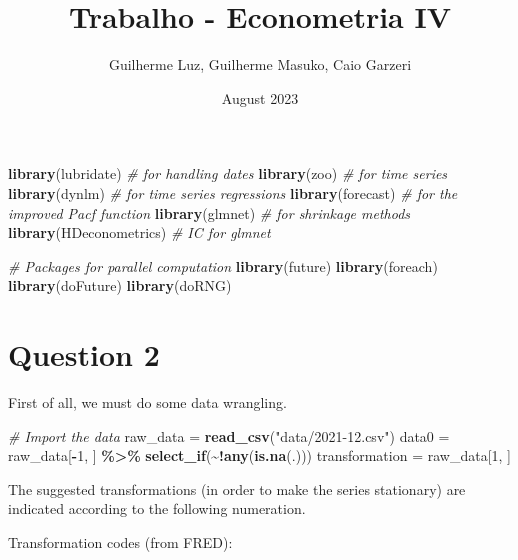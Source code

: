\documentclass[
]{article}
\title{Trabalho - Econometria IV}
\author{Guilherme Luz, Guilherme Masuko, Caio Garzeri}
\date{August 2023}
\newenvironment{Shaded}{\begin{snugshade}}{\end{snugshade}}
\newcommand{\CommentTok}[1]{\textcolor[rgb]{0.56,0.35,0.01}{\textit{#1}}}
\newcommand{\DecValTok}[1]{\textcolor[rgb]{0.00,0.00,0.81}{#1}}
\newcommand{\FunctionTok}[1]{\textcolor[rgb]{0.13,0.29,0.53}{\textbf{#1}}}
\newcommand{\NormalTok}[1]{#1}
\newcommand{\OtherTok}[1]{\textcolor[rgb]{0.56,0.35,0.01}{#1}}
\newcommand{\SpecialCharTok}[1]{\textcolor[rgb]{0.81,0.36,0.00}{\textbf{#1}}}
\newcommand{\StringTok}[1]{\textcolor[rgb]{0.31,0.60,0.02}{#1}}
\begin{document}
\maketitle

\begin{Shaded}
\begin{Highlighting}[]
\FunctionTok{library}\NormalTok{(lubridate)  }\CommentTok{\# for handling dates}
\FunctionTok{library}\NormalTok{(zoo)  }\CommentTok{\# for time series}
\FunctionTok{library}\NormalTok{(dynlm)  }\CommentTok{\# for time series regressions}
\FunctionTok{library}\NormalTok{(forecast)  }\CommentTok{\# for the improved Pacf function}
\FunctionTok{library}\NormalTok{(glmnet)  }\CommentTok{\# for shrinkage methods}
\FunctionTok{library}\NormalTok{(HDeconometrics)  }\CommentTok{\# IC for glmnet}

\CommentTok{\# Packages for parallel computation}
\FunctionTok{library}\NormalTok{(future)}
\FunctionTok{library}\NormalTok{(foreach)}
\FunctionTok{library}\NormalTok{(doFuture)}
\FunctionTok{library}\NormalTok{(doRNG)}
\end{Highlighting}
\end{Shaded}

\hypertarget{question-2}{%
\section{Question 2}\label{question-2}}

First of all, we must do some data wrangling.

\begin{Shaded}
\begin{Highlighting}[]
\CommentTok{\# Import the data}
\NormalTok{raw\_data }\OtherTok{=} \FunctionTok{read\_csv}\NormalTok{(}\StringTok{"data/2021{-}12.csv"}\NormalTok{)}
\NormalTok{data0 }\OtherTok{=}\NormalTok{ raw\_data[}\SpecialCharTok{{-}}\DecValTok{1}\NormalTok{, ] }\SpecialCharTok{\%\textgreater{}\%}
    \FunctionTok{select\_if}\NormalTok{(}\SpecialCharTok{\textasciitilde{}!}\FunctionTok{any}\NormalTok{(}\FunctionTok{is.na}\NormalTok{(.)))}
\NormalTok{transformation }\OtherTok{=}\NormalTok{ raw\_data[}\DecValTok{1}\NormalTok{, ]}
\end{Highlighting}
\end{Shaded}

The suggested transformations (in order to make the series stationary)
are indicated according to the following numeration.

Transformation codes (from FRED):
\end{document}
